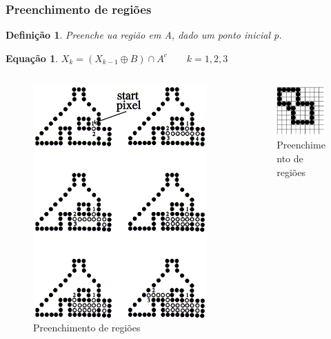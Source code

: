 \documentclass[aspectratio=169]{beamer}
\theoremstyle{Definition}
\newtheorem{defn}{Defini\c c\~ao}
\newtheorem{eq}[theorem]{Equa\c c\~ao}
\begin{document}
\begin{frame}
	\frametitle{Preenchimento de regiões}
	
	\begin{defn}
    	Preenche ua região em A, dado um ponto inicial p.
	\end{defn}
	
	\begin{eq}
    	$ X_k = ( X_{k-1} \oplus B) \cap A^c \qquad k = 1, 2, 3$   
	\end{eq}
	
	\begin{columns}
		\begin{column}{0.5\textwidth}
			\begin{figure}[h]
	  		 	\includegraphics[height=0.3\paperheight]{imagens/fill}
				\caption{Preenchimento de regiões}\label{figRegion1}
			\end{figure}
		\end{column}
		\begin{column}{0.5\textwidth}
			\begin{figure}[h]
			   	\includegraphics[width=4cm, height=0.3\paperheight]{imagens/fill2}
				\caption{Preenchimento de regiões}\label{figRegion2}
			\end{figure}
		\end{column}
	\end{columns}
	
\end{frame}
\end{document}
